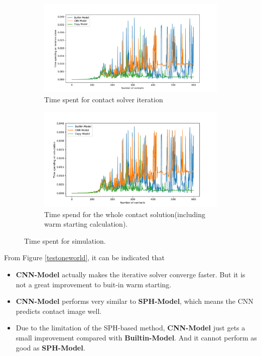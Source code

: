 \begin{figure}[!h]
        \centering
        \begin{subfigure}[b]{0.8\textwidth}
            \includegraphics[width=\textwidth]{Figures/cnntime}
            \caption{Time spent for contact solver iteration}
            \label{fig:iter}
        \end{subfigure}
        \begin{subfigure}[b]{0.8\textwidth}
            \includegraphics[width=\textwidth]{Figures/cnntotal}
            \caption{Time spend for the whole contact solution(including warm starting calculation).}
            \label{Total}
        \end{subfigure}
        \caption{Time spent for simulation.}
        \label{fig:time}
\end{figure}

From Figure \ref{testoneworld}, it can be indicated that 
\begin{itemize}
    \item \textbf{CNN-Model} actually makes the iterative solver converge faster. But it is not a great improvement to buit-in warm starting.
    \item \textbf{CNN-Model} performs very similar to \textbf{SPH-Model}, which means the CNN predicts contact image well. 
    \item Due to the limitation of the SPH-based method, \textbf{CNN-Model} just gets a small improvement compared with \textbf{Builtin-Model}. And it cannot perform as good as \textbf{SPH-Model}.
\end{itemize}

